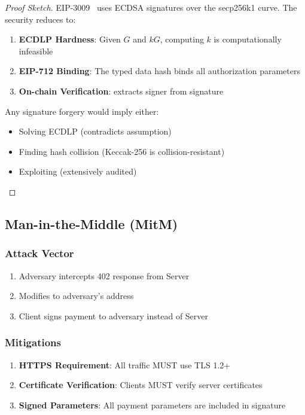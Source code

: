 \begin{proof}[Proof Sketch]
EIP-3009~\cite{eip3009} uses ECDSA signatures over the secp256k1 curve. The security reduces to:

\begin{enumerate}
    \item \textbf{ECDLP Hardness}: Given $G$ and $kG$, computing $k$ is computationally infeasible
    \item \textbf{EIP-712 Binding}: The typed data hash binds all authorization parameters
    \item \textbf{On-chain Verification}:  extracts signer from signature
\end{enumerate}

Any signature forgery would imply either:
\begin{itemize}
    \item Solving ECDLP (contradicts assumption)
    \item Finding hash collision (Keccak-256 is collision-resistant)
    \item Exploiting  (extensively audited)
\end{itemize}
\end{proof}

\subsection{Man-in-the-Middle (MitM)}

\subsubsection{Attack Vector}

\begin{enumerate}
    \item Adversary intercepts 402 response from Server
    \item Modifies  to adversary's address
    \item Client signs payment to adversary instead of Server
\end{enumerate}

\subsubsection{Mitigations}

\begin{enumerate}
    \item \textbf{HTTPS Requirement}: All \tprotocol{} traffic MUST use TLS 1.2+
    \item \textbf{Certificate Verification}: Clients MUST verify server certificates
    \item \textbf{Signed Parameters}: All payment parameters are included in signature
\end{enumerate}

